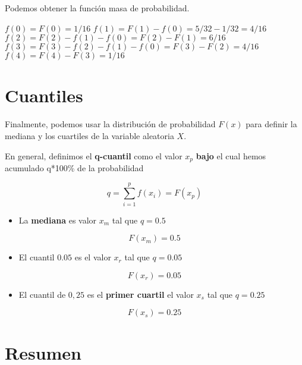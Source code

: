 \documentclass[
]{book}
\providecommand{\tightlist}{%
  \setlength{\itemsep}{0pt}\setlength{\parskip}{0pt}}
\begin{document}
Podemos obtener la función masa de probabilidad.

\(f(0)=F(0)=1/16\)
\(f(1)=F(1)-f(0)=5/32-1/32=4/16\)
\(f(2)=F(2)-f(1)-f(0)=F(2)-F(1)=6/16\)
\(f(3)=F(3)-f(2)-f(1)-f(0)=F(3)-F(2)=4/16\)
\(f(4)=F(4)-F(3)=1/16\)

\hypertarget{cuantiles}{%
\section{Cuantiles}\label{cuantiles}}

Finalmente, podemos usar la distribución de probabilidad \(F(x)\) para definir la mediana y los cuartiles de la variable aleatoria \(X\).

En general, definimos el \textbf{q-cuantil} como el valor \(x_{p}\) \textbf{bajo} el cual hemos acumulado q*100\% de la probabilidad

\[q=\sum_{i=1}^pf(x_i) = F (x_p)\]

\begin{itemize}
\tightlist
\item
  La \textbf{mediana} es valor \(x_m\) tal que \(q=0.5\)
\end{itemize}

\[F(x_{m})=0.5\]

\begin{itemize}
\tightlist
\item
  El cuantil \(0.05\) es el valor \(x_{r}\) tal que \(q=0.05\)
\end{itemize}

\[F(x_{r})=0.05\]

\begin{itemize}
\tightlist
\item
  El cuantil de \(0,25\) es el \textbf{primer cuartil} el valor \(x_{s}\) tal que \(q=0.25\)
\end{itemize}

\[F(x_{s})=0.25\]

\hypertarget{resumen}{%
\section{Resumen}\label{resumen}}
\end{document}
